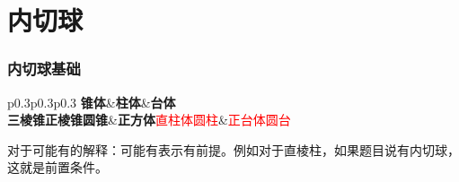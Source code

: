 \documentclass[10pt,CJKmath]{ctexart}
\begin{document}
\pagestyle{fancynotes}


\part{内切球}

\section{内切球基础}
\begin{longtable}{p{0.3\textwidth}p{0.3\textwidth}p{0.3\linewidth}}
	\large\textbf{锥体}&\large\textbf{柱体}&\large\textbf{台体}\\\toprule
	\textbf{三棱锥}\newline{}\textbf{正棱锥}\newline{}\textbf{圆锥}&\textbf{正方体}\newline{}\textcolor{red}{直柱体}\newline{}\textcolor{red}{圆柱}&\textcolor{red}{正台体}\newline{}\textcolor{red}{圆台}\\
	\bottomrule
	\caption{常见几何体内切球：黑体一定存在内切球，\textcolor{red}{红}色字体\emph{可能有}内切球}\label{tb1}
\end{longtable}

对于可能有的解释：可能有表示有前提。例如对于直棱柱，如果题目说有内切球，这就是前置条件。
\end{document}
